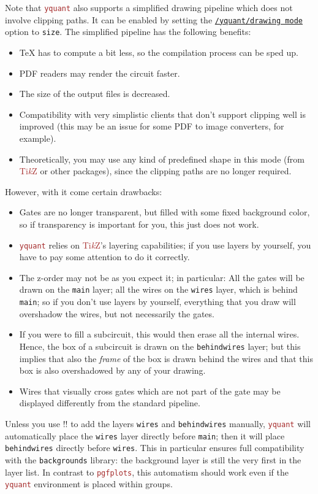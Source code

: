 \documentclass{scrartcl}
\def\TikZ{\textcolor{brown}{Ti\textit kZ}}
\def\pkg#1{\textcolor{brown}{\texttt{#1}}}
\def\style#1{\hyperref[style:#1]{\texttt{#1}}}
\def\Yquant{\pkg{yquant}}
\begin{document}
         Note that \Yquant{} also supports a simplified drawing pipeline which does not involve clipping paths.
         It can be enabled by setting the \style{/yquant/drawing mode} option to \texttt{size}.
         The simplified pipeline has the following benefits:
         \begin{itemize}
            \item \TeX{} has to compute a bit less, so the compilation process can be sped up.
            \item PDF readers may render the circuit faster.
            \item The size of the output files is decreased.
            \item Compatibility with very simplistic clients that don't support clipping well is improved (this may be an issue for some PDF to image converters, for example).
            \item Theoretically, you may use any kind of predefined shape in this mode (from \TikZ{} or other packages), since the clipping paths are no longer required.
         \end{itemize}
         However, with it come certain drawbacks:
         \begin{itemize}
            \item Gates are no longer transparent, but filled with some fixed background color, so if transparency is important for you, this just does not work.
            \item \Yquant{} relies on \TikZ's layering capabilities; if you use layers by yourself, you have to pay some attention to do it correctly.
            \item The z\hyp order may not be as you expect it; in particular:
               All the gates will be drawn on the \texttt{main} layer; all the wires on the \texttt{wires} layer, which is behind \texttt{main}; so if you don't use layers by yourself, everything that you draw will overshadow the wires, but not necessarily the gates.
            \item If you were to fill a subcircuit, this would then erase all the internal wires.
               Hence, the box of a subcircuit is drawn on the \texttt{behindwires} layer; but this implies that also the \emph{frame} of the box is drawn behind the wires and that this box is also overshadowed by any of your drawing.
            \item Wires that visually cross gates which are not part of the gate may be displayed differently from the standard pipeline.
         \end{itemize}
         Unless you use \tex!\pgfsetlayers! to add the layers \texttt{wires} and \texttt{behindwires} manually, \Yquant{} will automatically place the \texttt{wires} layer directly before \texttt{main}; then it will place \texttt{behindwires} directly before \texttt{wires}.
         This in particular ensures full compatibility with the \texttt{backgrounds} library: the background layer is still the very first in the layer list.
         In contrast to \pkg{pgfplots}, this automatism should work even if the \Yquant{} environment is placed within groups.
\end{document}

